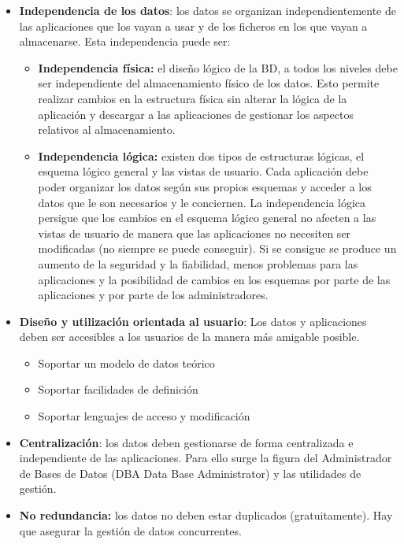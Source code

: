 \documentclass[a4paper,11pt]{article}
\begin{document}
\begin{itemize}
\item \textbf{Independencia de los datos}: los datos se organizan independientemente de las aplicaciones que los vayan a usar y de los ficheros en los que vayan a almacenarse. Esta independencia puede ser:
	\begin{itemize}
		\item \textbf{Independencia física:} el diseño lógico de la BD, a todos los niveles debe ser independiente del almacenamiento físico de los datos. Esto permite realizar cambios en la estructura física sin alterar la lógica de la aplicación y descargar a las aplicaciones de gestionar los aspectos relativos al almacenamiento.
		
		\item \textbf{Independencia lógica:} existen dos tipos de estructuras lógicas, el esquema lógico general y las vistas de usuario. Cada aplicación debe poder organizar los datos según sus propios esquemas y acceder a los datos que le son necesarios y le conciernen. La independencia lógica persigue que los cambios en el esquema lógico general no afecten a las vistas de usuario de manera que las aplicaciones no necesiten ser modificadas (no siempre se puede conseguir). Si se consigue se produce un aumento de la seguridad y la fiabilidad, menos problemas para las aplicaciones y la posibilidad de cambios en los esquemas por parte de las aplicaciones y por parte de los administradores.
	\end{itemize}
\item \textbf{Diseño y utilización orientada al usuario}: Los datos y aplicaciones deben ser accesibles a los usuarios de la manera más amigable posible.
		
	\begin{itemize}
		\item Soportar un modelo de datos teórico
		\item Soportar facilidades de definición
		\item Soportar lenguajes de acceso y modificación
	\end{itemize}
\item \textbf{Centralización}: los datos deben gestionarse de forma centralizada e independiente de las aplicaciones. Para ello surge la figura del Administrador de Bases de Datos (DBA Data Base Administrator) y las utilidades de gestión.

\item \textbf{No redundancia:} los datos no deben estar duplicados (gratuitamente). Hay que asegurar la gestión de datos concurrentes.


\end{itemize}
\end{document}
